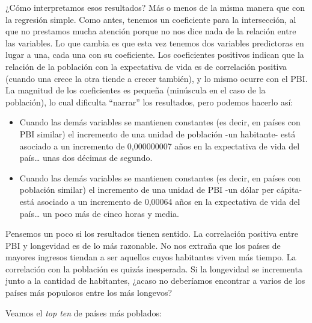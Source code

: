 \documentclass[spanish,]{book}
\newenvironment{Shaded}{\begin{snugshade}}{\end{snugshade}}
\newcommand{\DataTypeTok}[1]{\textcolor[rgb]{0.13,0.29,0.53}{#1}}
\newcommand{\DecValTok}[1]{\textcolor[rgb]{0.00,0.00,0.81}{#1}}
\newcommand{\KeywordTok}[1]{\textcolor[rgb]{0.13,0.29,0.53}{\textbf{#1}}}
\newcommand{\NormalTok}[1]{#1}
\newcommand{\OperatorTok}[1]{\textcolor[rgb]{0.81,0.36,0.00}{\textbf{#1}}}
\newcommand{\StringTok}[1]{\textcolor[rgb]{0.31,0.60,0.02}{#1}}
\providecommand{\tightlist}{%
  \setlength{\itemsep}{0pt}\setlength{\parskip}{0pt}}
\begin{document}
¿Cómo interpretamos esos resultados? Más o menos de la misma manera que con la regresión simple. Como antes, tenemos un coeficiente para la intersección, al que no prestamos mucha atención porque no nos dice nada de la relación entre las variables. Lo que cambia es que esta vez tenemos dos variables predictoras en lugar a una, cada una con su coeficiente. Los coeficientes positivos indican que la relación de la población con la expectativa de vida es de correlación positiva (cuando una crece la otra tiende a crecer también), y lo mismo ocurre con el PBI. La magnitud de los coeficientes es pequeña (minúscula en el caso de la población), lo cual dificulta ``narrar'' los resultados, pero podemos hacerlo así:

\begin{itemize}
\tightlist
\item
  Cuando las demás variables se mantienen constantes (es decir, en países con PBI similar) el incremento de una unidad de población -un habitante- está asociado a un incremento de 0,000000007 años en la expectativa de vida del país\ldots{} unas dos décimas de segundo.
\item
  Cuando las demás variables se mantienen constantes (es decir, en países con población similar) el incremento de una unidad de PBI -un dólar per cápita- está asociado a un incremento de 0,00064 años en la expectativa de vida del país\ldots{} un poco más de cinco horas y media.
\end{itemize}

Pensemos un poco si los resultados tienen sentido. La correlación positiva entre PBI y longevidad es de lo más razonable. No nos extraña que los países de mayores ingresos tiendan a ser aquellos cuyos habitantes viven más tiempo. La correlación con la población es quizás inesperada. Si la longevidad se incrementa junto a la cantidad de habitantes, ¿acaso no deberíamos encontrar a varios de los países más populosos entre los más longevos?

Veamos el \emph{top ten} de países más poblados:

\begin{Shaded}
\end{Shaded}
\end{document}
